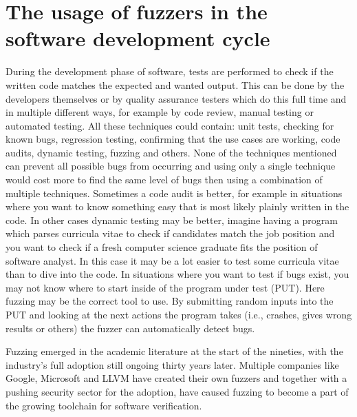 \section{The usage of fuzzers in the software development cycle}
\label{intro:SoftwareDevelopmentCycle}
During the development phase of software, tests are performed to check if the written code matches the expected and wanted output. This can be done by the developers themselves or by quality assurance testers which do this full time and in multiple different ways, for example by code review, manual testing or automated testing. All these techniques could contain: unit tests, checking for known bugs, regression testing, confirming that the use cases are working, code audits, dynamic testing, fuzzing and others. None of the techniques mentioned can prevent all possible bugs from occurring and using only a single technique would cost more to find the same level of bugs then using a combination of multiple techniques. Sometimes a code audit is better, for example in situations where you want to know something easy that is most likely plainly written in the code. In other cases dynamic testing may be better, imagine having a program which parses curricula vitae to check if candidates match the job position and you want to check if a fresh computer science graduate fits the position of software analyst. In this case it may be a lot easier to test some curricula vitae than to dive into the code. In situations where you want to test if bugs exist, you may not know where to start inside of the program under test (PUT). Here fuzzing may be the correct tool to use. By submitting random inputs into the PUT and looking at the next actions the program takes (i.e., crashes, gives wrong results or others) the fuzzer can automatically detect bugs.

Fuzzing emerged in the academic literature at the start of the nineties, with the industry’s full adoption still ongoing thirty years later. Multiple companies like Google, Microsoft and LLVM have created their own fuzzers and together with a pushing security sector for the adoption, have caused fuzzing to become a part of the growing toolchain for software verification.

